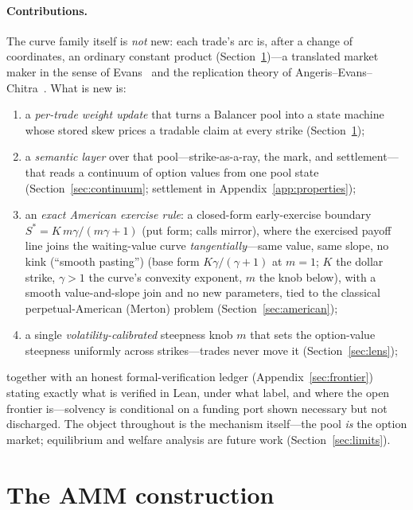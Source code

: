 \documentclass[runningheads]{llncs}
\begin{document}
\paragraph{Contributions.}
The curve family itself is \emph{not} new: each trade's arc is, after a change of
coordinates, an ordinary constant product (Section~\ref{sec:warp})---a translated
market maker in the sense of Evans~\cite{evans2020} and the replication theory of
Angeris--Evans--Chitra~\cite{angeris-replicating}. What is new is:
\begin{enumerate}[leftmargin=2em,itemsep=2pt]
  \item a \emph{per-trade weight update} that turns a Balancer pool into a
        state machine whose stored skew prices a tradable claim at every strike
        (Section~\ref{sec:warp});
  \item a \emph{semantic layer} over that pool---strike-as-a-ray, the mark, and
        settlement---that reads a continuum of option values from one pool state
        (Section~\ref{sec:continuum}; settlement in Appendix~\ref{app:properties});
  \item an \emph{exact American exercise rule}: a closed-form early-exercise
        boundary $S^{\ast}=K\,m\gamma/(m\gamma+1)$ (put form; calls mirror),
        where the exercised
        payoff line joins the waiting-value curve \emph{tangentially}---same
        value, same slope, no kink (``smooth pasting'') (base form
        $K\gamma/(\gamma+1)$ at $m=1$; $K$ the dollar strike, $\gamma>1$ the
        curve's convexity exponent, $m$ the knob below), with a smooth
        value-and-slope join and no new parameters, tied to the classical
        perpetual-American (Merton) problem (Section~\ref{sec:american});
  \item a single \emph{volatility-calibrated} steepness knob $m$ that sets
        the option-value steepness uniformly across strikes---trades never
        move it (Section~\ref{sec:lens});
\end{enumerate}
together with an honest formal-verification ledger (Appendix~\ref{sec:frontier})
stating exactly what is verified in Lean, under what label, and where the open
frontier is---solvency is conditional on a funding port shown necessary but not
discharged. The object throughout is the mechanism itself---the pool \emph{is} the
option market; equilibrium and welfare analysis are future work
(Section~\ref{sec:limits}).

\section{The AMM construction}\label{sec:warp}
\end{document}
